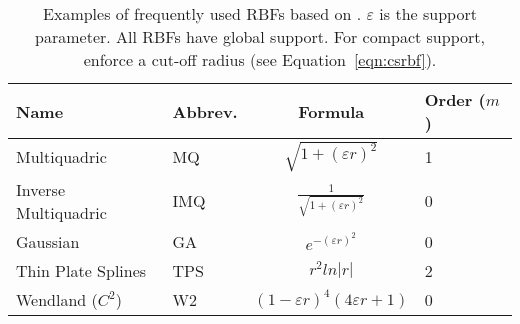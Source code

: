 
\newcommand{\rbf}[4]{#1 & #2 & #3 & #4}
\begin{table}[t]
   \centering
      \caption{Examples of frequently used RBFs based on \cite{Fornberg2008, Fasshauer2007}. $\varepsilon$ is the support parameter. 
   All RBFs have global support. For compact support, enforce a cut-off radius (see Equation~\ref{eqn:csrbf}).}
   \label{tbl:rbfs}
   \begin{tabular}{L{1.5in} | C{1.0in} | c |C{1.0in}| } %
   \rbf{Name}{Abbrev.}{Formula}{Order ($m$)} \\
   \hline\hline
   \rbf{Multiquadric}{MQ}{$\sqrt{1+(\varepsilon r)^2}$}{1} \\
   \rbf{Inverse Multiquadric}{IMQ}{$\frac{1}{\sqrt{1+(\varepsilon r)^2}}$}{0} \\
   \rbf{Gaussian}{GA}{$e^{-(\varepsilon r)^2}$}{0} \\
   \rbf{Thin Plate Splines}{TPS}{$r^2 ln |r|$}{2} \\
   \rbf{Wendland ($C^2$)}{W2}{$(1-\varepsilon r)^4 (4\varepsilon r + 1)$}{0}
   \end{tabular}
\end{table}
